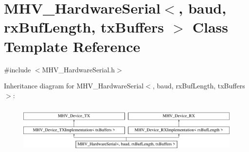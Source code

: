 \hypertarget{class_m_h_v___hardware_serial}{\section{M\-H\-V\-\_\-\-Hardware\-Serial$<$, baud, rx\-Buf\-Length, tx\-Buffers $>$ Class Template Reference}
\label{class_m_h_v___hardware_serial}
}


{\ttfamily \#include $<$M\-H\-V\-\_\-\-Hardware\-Serial.\-h$>$}

Inheritance diagram for M\-H\-V\-\_\-\-Hardware\-Serial$<$, baud, rx\-Buf\-Length, tx\-Buffers $>$\-:\begin{figure}[H]
\begin{center}
\leavevmode
\includegraphics[height=2.492581cm]{class_m_h_v___hardware_serial}
\end{center}
\end{figure}
